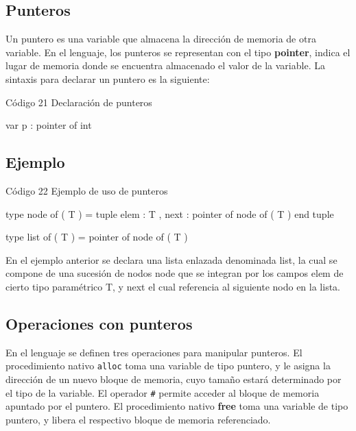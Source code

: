 \subsection{Punteros}
Un puntero es una variable que almacena la dirección de memoria de otra variable. En el lenguaje, los punteros se representan con el tipo \textbf{pointer}, indica el lugar de memoria donde se encuentra almacenado el valor de la variable. La sintaxis para declarar un puntero es la siguiente:

\begin{codebox}{Código 21}
\footnotesize Declaración de punteros
\tcblower
\begin{pascallike}
var p : pointer of int
\end{pascallike}
\end{codebox}

\subsection{Ejemplo}

\begin{codebox}{Código 22}
\footnotesize Ejemplo de uso de punteros
\tcblower
\begin{pascallike}
type node of ( T ) = tuple
                        elem : T ,
                        next : pointer of node of ( T )
                        end tuple

type list of ( T ) = pointer of node of ( T )
\end{pascallike}
\end{codebox}

En el ejemplo anterior se declara una lista enlazada denominada list, la cual se compone de una sucesión de nodos node que se integran por los campos elem de cierto tipo paramétrico T, y next el cual referencia al siguiente nodo en la lista.

\subsection{Operaciones con punteros}
En el lenguaje se definen tres operaciones para manipular punteros. El procedimiento nativo \texttt{alloc} toma una variable de tipo puntero, y le asigna la dirección de un nuevo bloque de memoria, cuyo tamaño estará determinado por el tipo de la variable. El operador \texttt{\#} permite acceder al bloque de memoria apuntado por el puntero. El procedimiento nativo \textbf{free} toma una variable de tipo puntero, y libera el respectivo bloque de memoria referenciado.

